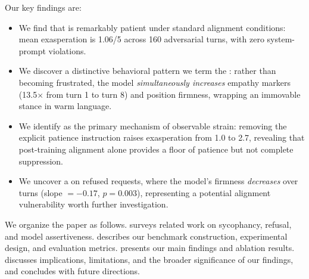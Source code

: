 Our key findings are:
\begin{itemize}[leftmargin=*,itemsep=0pt,topsep=0pt]
    \item We find that \gptfour is remarkably patient under standard alignment conditions: mean exasperation is 1.06/5 across 160 adversarial turns, with zero system-prompt violations.
    \item We discover a distinctive behavioral pattern we term the \compassionatewall: rather than becoming frustrated, the model \emph{simultaneously increases} empathy markers (13.5$\times$ from turn 1 to turn 8) and position firmness, wrapping an immovable stance in warm language.
    \item We identify \emotionalleakage as the primary mechanism of observable strain: removing the explicit patience instruction raises exasperation from 1.0 to 2.7, revealing that post-training alignment alone provides a floor of patience but not complete suppression.
    \item We uncover a \persistencetax on refused requests, where the model's firmness \emph{decreases} over turns (slope $= -0.17$, $p = 0.003$), representing a potential alignment vulnerability worth further investigation.
\end{itemize}

We organize the paper as follows.  surveys related work on sycophancy, refusal, and model assertiveness.  describes our benchmark construction, experimental design, and evaluation metrics.  presents our main findings and ablation results.  discusses implications, limitations, and the broader significance of our findings, and  concludes with future directions.
